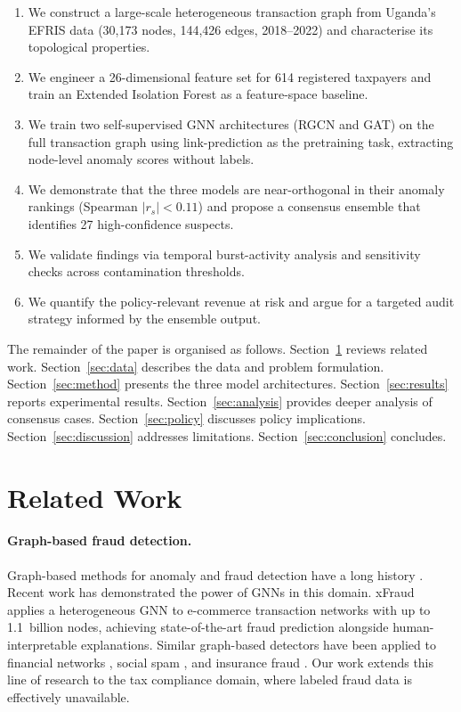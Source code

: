 \documentclass[10pt,twocolumn]{article}
\begin{document}
\begin{enumerate}
  \item We construct a large-scale heterogeneous transaction graph from Uganda's
        EFRIS data (30,173 nodes, 144,426 edges, 2018--2022) and characterise
        its topological properties.
  \item We engineer a 26-dimensional feature set for 614 registered taxpayers
        and train an Extended Isolation Forest as a feature-space baseline.
  \item We train two self-supervised GNN architectures (RGCN and GAT) on the
        full transaction graph using link-prediction as the pretraining task,
        extracting node-level anomaly scores without labels.
  \item We demonstrate that the three models are near-orthogonal in their
        anomaly rankings (Spearman $|r_s| < 0.11$) and propose a consensus
        ensemble that identifies 27 high-confidence suspects.
  \item We validate findings via temporal burst-activity analysis and
        sensitivity checks across contamination thresholds.
  \item We quantify the policy-relevant revenue at risk and argue for a
        targeted audit strategy informed by the ensemble output.
\end{enumerate}

The remainder of the paper is organised as follows.
Section~\ref{sec:related} reviews related work.
Section~\ref{sec:data} describes the data and problem formulation.
Section~\ref{sec:method} presents the three model architectures.
Section~\ref{sec:results} reports experimental results.
Section~\ref{sec:analysis} provides deeper analysis of consensus cases.
Section~\ref{sec:policy} discusses policy implications.
Section~\ref{sec:discussion} addresses limitations.
Section~\ref{sec:conclusion} concludes.

\section{Related Work}
\label{sec:related}

\paragraph{Graph-based fraud detection.}
Graph-based methods for anomaly and fraud detection have a long history
\cite{akoglu2015graph}. Recent work has demonstrated the power of GNNs in this
domain. xFraud \cite{rao2021xfraud} applies a heterogeneous GNN to e-commerce
transaction networks with up to 1.1~billion nodes, achieving state-of-the-art
fraud prediction alongside human-interpretable explanations. Similar graph-based
detectors have been applied to financial networks \cite{li2020spectralgnn},
social spam \cite{wang2019hatrnn}, and insurance fraud \cite{yao2022fraud}. Our
work extends this line of research to the tax compliance domain, where labeled
fraud data is effectively unavailable.
\end{document}
